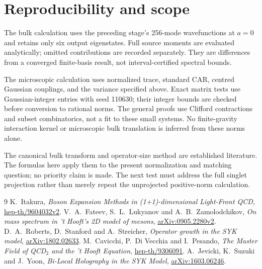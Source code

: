 \documentclass[11pt,a4paper]{article}
\begin{document}
\newpage
\section*{Reproducibility and scope}
The bulk calculation uses the preceding stage's 256-mode wavefunctions
at $a=0$ and retains only six output eigenstates. Full source moments
are evaluated analytically; omitted contributions are recorded
separately. They are differences from a converged finite-basis result,
not interval-certified spectral bounds.

The microscopic calculation uses normalized trace, standard CAR,
centred Gaussian couplings, and the variance specified above. Exact
matrix tests use Gaussian-integer entries with seed 110630; their
integer bounds are checked before conversion to rational norms.
The general proofs use Clifford contractions and subset combinatorics,
not a fit to these small systems. No finite-gravity interaction kernel
or microscopic bulk translation is inferred from these norms alone.

The canonical bulk transform and operator-size method are established
literature. The formulas here apply them to the present normalization
and matching question; no priority claim is made. The next test must
address the full singlet projection rather than merely repeat the
unprojected positive-norm calculation.

\begin{thebibliography}{9}
 K.~Itakura, \emph{Boson Expansion Methods in
(1+1)-dimensional Light-Front QCD},
\href{https://arxiv.org/abs/hep-th/9604032}{hep-th/9604032v2}.
 V.~A.~Fateev, S.~L.~Lukyanov and A.~B.~Zamolodchikov,
\emph{On mass spectrum in 't Hooft's 2D model of mesons},
\href{https://arxiv.org/abs/0905.2280}{arXiv:0905.2280v2}.
 D.~A.~Roberts, D.~Stanford and A.~Streicher,
\emph{Operator growth in the SYK model},
\href{https://arxiv.org/abs/1802.02633}{arXiv:1802.02633}.
 M.~Cavicchi, P.~Di Vecchia and I.~Pesando,
\emph{The Master Field of QCD$_2$ and the 't Hooft Equation},
\href{https://arxiv.org/abs/hep-th/9306091}{hep-th/9306091}.
 A.~Jevicki, K.~Suzuki and J.~Yoon,
\emph{Bi-Local Holography in the SYK Model},
\href{https://arxiv.org/abs/1603.06246}{arXiv:1603.06246}.
\end{thebibliography}
\end{document}
